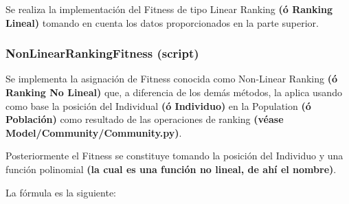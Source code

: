 \documentclass[letterpaper,10pt,english]{sphinxmanual}
\begin{document}
\begin{fulllineitems}
\label{Model/Fitness/LinearRankingFitness:Model.Fitness.LinearRankingFitness.assign_fitness}
Se realiza la implementación del Fitness de tipo Linear Ranking
\textbf{(ó Ranking Lineal)} tomando en cuenta los datos proporcionados
en la parte superior.

\end{fulllineitems}



\subsubsection{NonLinearRankingFitness (script)}
\label{Model/Fitness/NonLinearRankingFitness::doc}\label{Model/Fitness/NonLinearRankingFitness:nonlinearrankingfitness-script}
\begin{DUlineblock}{0em}
\item[] Se implementa la asignación de Fitness conocida como Non-Linear Ranking
\textbf{(ó Ranking No Lineal)} que, a diferencia de los demás métodos, la aplica
usando como base la posición del Individual \textbf{(ó Individuo)} en la Population
\textbf{(ó Población)} como resultado de las operaciones de ranking
\textbf{(véase Model/Community/Community.py)}.
\item[] Posteriormente el Fitness se constituye tomando la posición del Individuo y
una función polinomial \textbf{(la cual es una función no lineal, de ahí el nombre)}.
\item[] La fórmula es la siguiente:
\end{DUlineblock}
\end{document}
